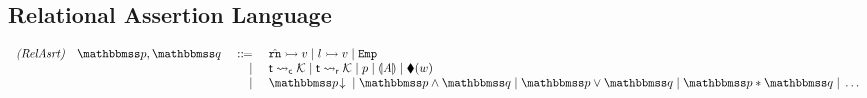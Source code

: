 \subsection{Relational Assertion Language}
\label{subsec:rel-assertion}
\vspace*{-1.2em}
\begin{center}
    \[
        \begin{array}{rcl}
            \textit{(RelAsrt)} \quad \relastP, \relastQ & \ \define \ & 
            \hregsto{\hrn}{\val} \sepline 
            \hmsto{\loc}{\val} \sepline
            \empAst \\
            & \ \ \ | &
            \astCurCont{\thrdid}{\hthrdlocalst} \sepline 
            \astRdyCont{\thrdid}{\hthrdlocalst} \sepline
            \astP \sepline \safePrimAst{\primcom} \sepline 
            \metricAst{\word} \\
            & \ \ \ | & 
            \nxtAst{\relastP} \sepline 
            \relastP \land \relastQ \sepline
            \relastP \lor \relastQ \sepline
            \relastP \sepstar \relastQ \sepline \dots 
        \end{array} 
    \]
    \vspace*{-0.8em}
    \label{fig:Syntax of Relational Assertion}
\end{center}


